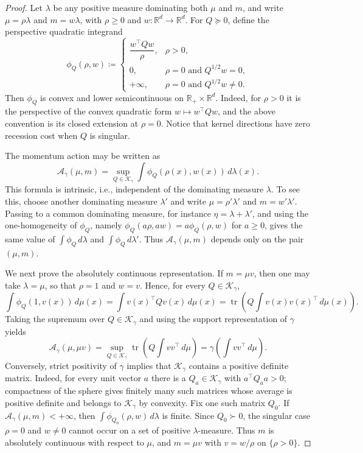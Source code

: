 \documentclass{article}
\newcommand{\R}{\mathbb{R}}
\newcommand{\tr}{\operatorname{tr}}
\newcommand{\cK}{\mathcal K_\gamma}
\newcommand{\cA}{\mathcal A_\gamma}
\begin{document}
\begin{proof}
Let $\lambda$ be any positive measure dominating both $\mu$ and $m$, and write
$\mu=\rho\lambda$ and $m=w\lambda$, with $\rho\ge0$ and
$w:\R^d\to\R^d$. For $Q\succeq0$, define the perspective quadratic integrand
\[
    \phi_Q(\rho,w)
    \coloneqq
    \begin{cases}
        \dfrac{w^\top Qw}{\rho}, & \rho>0, \\[0.8em]
        0, & \rho=0 \text{ and } Q^{1/2}w=0, \\[0.3em]
        +\infty, & \rho=0 \text{ and } Q^{1/2}w\neq0.
    \end{cases}
\]
Then $\phi_Q$ is convex and lower semicontinuous on
$\R_+\times\R^d$. Indeed, for $\rho>0$ it is the perspective of the convex
quadratic form $w\mapsto w^\top Qw$, and the above convention is its closed
extension at $\rho=0$. Notice that kernel directions have zero recession cost
when $Q$ is singular.

The momentum action may be written as
\[
    \cA(\mu,m)
    =
    \sup_{Q\in\cK}
    \int \phi_Q(\rho(x),w(x))\,d\lambda(x).
\]
This formula is intrinsic, i.e., independent of the dominating measure
$\lambda$. To see this, choose another dominating measure $\lambda'$ and write
$\mu=\rho'\lambda'$ and $m=w'\lambda'$. Passing to a common dominating measure,
for instance $\eta=\lambda+\lambda'$, and using the one-homogeneity of
$\phi_Q$, namely $\phi_Q(a\rho,aw)=a\phi_Q(\rho,w)$ for $a\ge0$, gives the same
value of $\int\phi_Q\,d\lambda$ and $\int\phi_Q\,d\lambda'$. Thus
$\cA(\mu,m)$ depends only on the pair $(\mu,m)$.

We next prove the absolutely continuous representation. If $m=\mu v$, then
one may take $\lambda=\mu$, so that $\rho=1$ and $w=v$. Hence, for every
$Q\in\cK$,
\[
    \int \phi_Q(1,v(x))\,d\mu(x)
    =
    \int v(x)^\top Qv(x)\,d\mu(x)
    =
    \tr\!\left(
        Q\int v(x)v(x)^\top\,d\mu(x)
    \right).
\]
Taking the supremum over $Q\in\cK$ and using the support representation of
$\gamma$ yields
\[
    \cA(\mu,\mu v)
    =
    \sup_{Q\in\cK}
    \tr\!\left(
        Q\int vv^\top\,d\mu
    \right)
    =
    \gamma\!\left(
        \int vv^\top\,d\mu
    \right).
\]
Conversely, strict positivity of $\gamma$ implies that $\cK$ contains a
positive definite matrix. Indeed, for every unit vector $a$ there is a
$Q_a\in\cK$ with $a^\top Q_a a>0$; compactness of the sphere gives finitely
many such matrices whose average is positive definite and belongs to $\cK$ by
convexity. Fix one such matrix $Q_0$. If $\cA(\mu,m)<+\infty$, then
$\int\phi_{Q_0}(\rho,w)\,d\lambda$ is finite. Since $Q_0\succ0$, the singular
case $\rho=0$ and $w\neq0$ cannot occur on a set of positive
$\lambda$-measure. Thus $m$ is absolutely continuous with respect to $\mu$,
and $m=\mu v$ with $v=w/\rho$ on $\{\rho>0\}$.


\end{proof}
\end{document}
